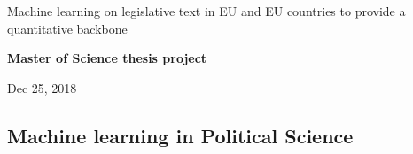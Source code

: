 \documentclass[%
oneside,                 %
final,                   %
10pt]{article}
\begin{document}

\newcommand{\exercisesection}[1]{\subsection*{#1}}






\thispagestyle{empty}

\begin{center}
{\LARGE\bf
\begin{spacing}{1.25}
Machine learning on legislative text in EU and EU countries to provide a quantitative backbone
\end{spacing}
}
\end{center}


\begin{center}
{\bf Master of Science thesis project${}^{}$} \\ [0mm]
\end{center}

\begin{center}
\end{center}
    

\begin{center}
Dec 25, 2018
\end{center}

\vspace{1cm}


\subsection{Machine learning in Political Science}
\end{document}
